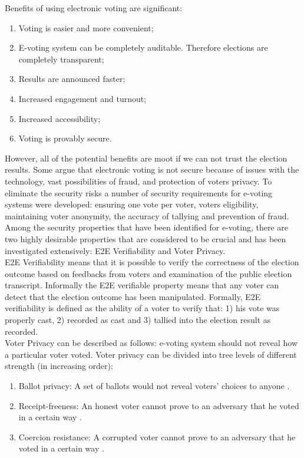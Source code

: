 Benefits of using electronic voting  are significant:
\begin{enumerate}
\item Voting is easier and more convenient;
\item E-voting system can be completely auditable. Therefore elections are completely transparent;
\item Results are announced faster;
\item Increased engagement and turnout; 
\item Increased accessibility;
\item Voting is provably secure.
 \end{enumerate}

However, all of the potential benefits are moot if we can not trust the election results. Some argue that electronic voting is not secure because of issues with the technology, vast possibilities of fraud, and protection of voters privacy.  To eliminate the security risks a number of security requirements for e-voting systems were developed: ensuring one vote per voter, voters eligibility, maintaining voter anonymity, the accuracy of tallying and prevention of fraud.\\
 
Among the security properties that have been identified for e-voting, there are two highly desirable properties that are considered to be crucial and has been investigated extensively: E2E Verifiability and Voter Privacy.\\

 E2E Verifiability means that it is possible to verify the correctness of the election outcome based on feedbacks from voters and examination of the public election transcript. Informally the E2E verifiable property means that any voter can detect that the election outcome has been manipulated.  Formally, E2E verifiability is defined as the ability of a voter  to verify that: 1) his vote was properly cast, 2) recorded as cast and 3) tallied into the election result as recorded. \\
 
 Voter Privacy can be described as follows: e-voting system should not reveal how a particular voter voted. Voter privacy can be divided into tree levels of different strength (in increasing order):
\begin{enumerate}
\item Ballot privacy: A set of ballots would not reveal  voters' choices to anyone \cite{Bernhard2015}. 
\item Receipt-freeness: An honest voter cannot prove to an adversary that he voted in a certain way \cite{Kremer}.
\item Coercion resistance: A corrupted voter cannot prove to an adversary that he voted in a certain way \cite{Delaune2006}.
\end{enumerate}

